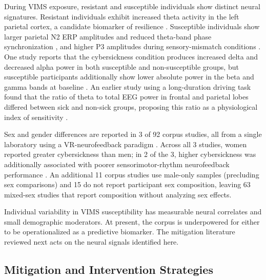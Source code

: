 During VIMS exposure, resistant and susceptible individuals show distinct neural signatures.
Resistant individuals exhibit increased theta activity in the left parietal cortex, a candidate biomarker of resilience \cite{liExploringNeuralBiomarkers2023}.
Susceptible individuals show larger parietal N2 ERP amplitudes and reduced theta-band phase synchronization \cite{weiMotionSicknesssusceptibleParticipants2019}, and higher P3 amplitudes during sensory-mismatch conditions \cite{ahnTemporalDynamicsVisually2020}.
One study reports that the cybersickness condition produces increased delta and decreased alpha power in both susceptible and non-susceptible groups, but susceptible participants additionally show lower absolute power in the beta and gamma bands at baseline \cite{jangEstimatingObjectiveEEG2022}.
An earlier study using a long-duration driving task found that the ratio of theta to total EEG power in frontal and parietal lobes differed between sick and non-sick groups, proposing this ratio as a physiological index of sensitivity \cite{parkLongTermStudySimulator2008}.

Sex and gender differences are reported in 3 of 92 corpus studies, all from a single laboratory using a VR-neurofeedback paradigm \cite{bergerSexDifferencesUser2021, bergerInfluencePlaceboTDCS2024, bergerManipulatingCybersicknessVirtual2025}.
Across all 3 studies, women reported greater cybersickness than men; in 2 of the 3, higher cybersickness was additionally associated with poorer sensorimotor-rhythm neurofeedback performance \cite{bergerInfluencePlaceboTDCS2024, bergerManipulatingCybersicknessVirtual2025}.
An additional 11 corpus studies use male-only samples (precluding sex comparisons) and 15 do not report participant sex composition, leaving 63 mixed-sex studies that report composition without analyzing sex effects.

Individual variability in VIMS susceptibility has measurable neural correlates and small demographic moderators.
At present, the corpus is underpowered for either to be operationalized as a predictive biomarker.
The mitigation literature reviewed next acts on the neural signals identified here.


\subsection{Mitigation and Intervention Strategies}\label{sec:mitigation}

